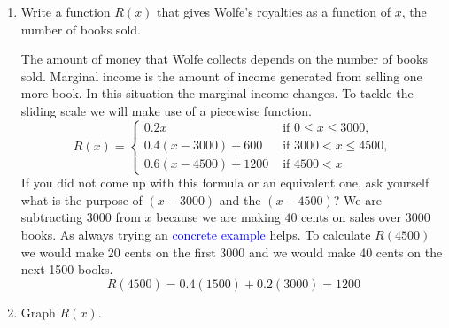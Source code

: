 \documentclass{article}
\begin{document}
\begin{enumerate}
  \begin{enumerate}
  \item \label{thomas-wolfe-formula}

    \begin{problem}[\vfill]
      Write a function $R(x)$ that gives Wolfe's royalties as a function
      of $ x$, the number of books sold.
    \end{problem}

    \begin{solution} 
      The amount of money that Wolfe collects depends on the number of books sold. Marginal income is the amount of income generated from selling one more book. In this situation the marginal income changes. To tackle the sliding scale we will make use of a piecewise function. 
      \[
        R(x)=
        \begin{cases}
          0.2 x & \text{ if } 0 \leq x \leq 3000, \\
          0.4 (x-3000) +600  & \text{ if } 3000 < x \leq 4500, \\
          0.6(x-4500) + 1200 & \text{ if } 4500 < x
        \end{cases}
      \]
      If you did not come up with this formula or an equivalent one, ask yourself what is the purpose of $(x-3000)$ and the $(x-4500)$? We are subtracting 3000 from $x$ because we are making $40$ cents on sales over $3000$ books. As always trying an \textcolor{blue}{ concrete example}  helps. To calculate $R(4500)$ we would make 20 cents on the first 3000 and we would make 40 cents on the next 1500 books. $$R(4500) = 0.4(1500)+0.2(3000)=1200$$

    \end{solution} 

  \item \label{thomas-wolfe-graph}
    \begin{problem}[\vfill]
      Graph $R(x)$.
    \end{problem}

    \begin{solution} 
      \begin{center}
      \end{center}
    \end{solution} 


\end{enumerate}
\end{enumerate}
\end{document}
